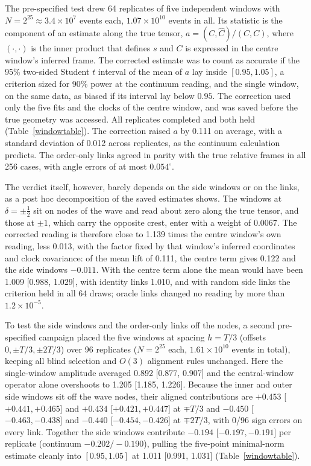\documentclass[11pt,a4paper]{article}
\begin{document}
The pre-specified test drew 64 replicates of five independent windows with
$N=2^{25}\approx3.4\times10^7$ events each, $1.07\times10^{10}$ events in
all. Its statistic is the component of an estimate along the true tensor,
$a=(C,\widehat C)/(C,C)$, where $(\cdot,\cdot)$ is the inner product that
defines $s$ and $C$ is expressed in the centre window's inferred frame. The
corrected estimate was to count as accurate if the 95\% two-sided Student
$t$ interval of the mean of $a$ lay inside $[0.95,1.05]$, a criterion sized
for 90\% power at the continuum reading, and the single window, on the same
data, as biased if its interval lay below $0.95$. The correction used only the five fits and the
clocks of the centre window, and was saved before the true geometry was
accessed. All replicates completed and both held
(Table~\ref{windowtable}). The correction raised $a$ by 0.111 on average,
with a standard deviation of 0.012 across replicates, as the continuum
calculation predicts. The order-only links
agreed in parity with the true relative frames in all 256 cases, with angle
errors of at most $0.054^\circ$.

The verdict itself, however, barely depends on the side windows or on the
links, as a post hoc decomposition of the saved estimates shows. The windows
at $\delta=\pm\tfrac12$ sit on nodes of the wave and read about zero along
the true tensor, and those at $\pm1$, which carry the opposite crest, enter
with a weight of 0.0067. The corrected reading is therefore close to 1.139
times the centre window's own reading, less 0.013, with the factor fixed by
that window's inferred coordinates and clock covariance: of the mean lift of
0.111, the centre term gives 0.122 and the side windows $-0.011$. With the
centre term alone the mean would have been 1.009 [0.988, 1.029], with
identity links 1.010, and with random side links the criterion held in all
64 draws; oracle links changed no reading by more than $1.2\times10^{-5}$.

To test the side windows and the order-only links off the nodes, a second
pre-specified campaign placed the five windows at spacing $h=T/3$ (offsets
$0,\pm T/3,\pm 2T/3$) over 96 replicates ($N=2^{25}$ each, $1.61\times10^{10}$
events in total), keeping all blind selection and $O(3)$ alignment rules
unchanged. Here the single-window amplitude averaged 0.892 [0.877, 0.907]
and the central-window operator alone overshoots to 1.205 [1.185, 1.226].
Because the inner and outer side windows sit off the wave nodes, their
aligned contributions are $+0.453$ [$+0.441,+0.465$] and $+0.434$
[$+0.421,+0.447$] at $\mp T/3$ and $-0.450$ [$-0.463,-0.438$] and $-0.440$
[$-0.454,-0.426$] at $\mp 2T/3$, with 0/96 sign errors on every link.
Together the side windows contribute $-0.194$ [$-0.197,-0.191$] per
replicate (continuum $-0.202/-0.190$), pulling the five-point minimal-norm
estimate cleanly into $[0.95,1.05]$ at 1.011 [0.991, 1.031]
(Table~\ref{windowtable}).
\end{document}
